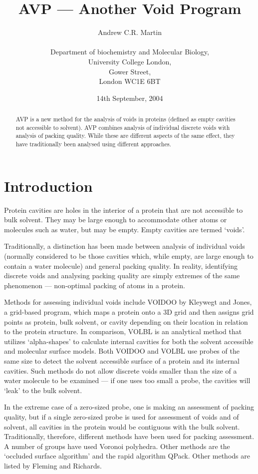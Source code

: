 \documentclass{article}
\title{AVP --- Another Void Program}
\author{Andrew C.R. Martin\\
\vspace*{1ex}\\
Department of biochemistry and Molecular Biology,\\
University College London,\\
Gower Street,\\
London WC1E 6BT}
\date{14th September, 2004}
\let\shortcite\cite
\begin{document}
\maketitle

\begin{abstract}
AVP is a new method for the analysis of voids in proteins (defined as
empty cavities not accessible to solvent). AVP combines analysis of
individual discrete voids with analysis of packing quality. While
these are different aspects of the same effect, they have
traditionally been analysed using different approaches.
\end{abstract}


\section{Introduction}
Protein cavities are holes in the interior of a protein that are not
accessible to bulk solvent. They may be large enough to accommodate
other atoms or molecules such as water, but may be empty. Empty
cavities are termed `voids'.

Traditionally, a distinction has been made between analysis of
individual voids (normally considered to be those cavities which,
while empty, are large enough to contain a water molecule) and general
packing quality.  In reality, identifying discrete voids and analysing
packing quality are simply extremes of the same phenomenon ---
non-optimal packing of atoms in a protein.

Methods for assessing individual voids include VOIDOO by Kleywegt and
Jones\shortcite{kleywegt:voidoo}, a grid-based program, which maps a
protein onto a 3D grid and then assigns grid points as protein, bulk
solvent, or cavity depending on their location in relation to the
protein structure. In comparison, VOLBL\cite{edelsbrunner:voids} is an
analytical method that utilizes `alpha-shapes' to calculate internal
cavities for both the solvent accessible and molecular surface
models. Both VOIDOO and VOLBL use probes of the same size to detect
the solvent accessible surface of a protein and its internal cavities.
Such methods do not allow discrete voids smaller than the size of a
water molecule to be examined --- if one uses too small a probe, the
cavities will `leak' to the bulk solvent.

In the extreme case of a zero-sized probe, one is making an assessment
of packing quality, but if a single zero-sized probe is used for
assessment of voids and of solvent, all cavities in the protein would
be contiguous with the bulk solvent. Traditionally, therefore,
different methods have been used for packing assessment.  A number of
groups have used Voronoi
polyhedra\cite{lesk:folding,ptitsyn:evolution,gerstein:volume,tsai:packing,richards:packing}.
Other methods are the `occluded surface
algorithm'\cite{pattabiraman:occluded} and the rapid algorithm
QPack\cite{gregoret:qpack}.  Other methods are listed by Fleming and
Richards\shortcite{fleming:packing}.
\end{document}
